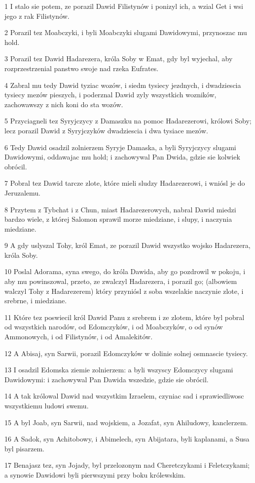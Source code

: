 \par 1 I stalo sie potem, ze porazil Dawid Filistynów i ponizyl ich, a wzial Get i wsi jego z rak Filistynów.
\par 2 Porazil tez Moabczyki, i byli Moabczyki slugami Dawidowymi, przynoszac mu hold.
\par 3 Porazil tez Dawid Hadarezera, króla Soby w Emat, gdy byl wyjechal, aby rozprzestrzenial panstwo swoje nad rzeka Eufrates.
\par 4 Zabral mu tedy Dawid tyziac wozów, i siedm tysiecy jezdnych, i dwadziescia tysiecy mezów pieszych, i poderznal Dawid zyly wszystkich wozników, zachowawszy z nich koni do sta wozów.
\par 5 Przyciagneli tez Syryjczycy z Damaszku na pomoc Hadarezerowi, królowi Soby; lecz porazil Dawid z Syryjczyków dwadziescia i dwa tysiace mezów.
\par 6 Tedy Dawid osadzil zolnierzem Syryje Damaska, a byli Syryjczycy slugami Dawidowymi, oddawajac mu hold; i zachowywal Pan Dwida, gdzie sie kolwiek obrócil.
\par 7 Pobral tez Dawid tarcze zlote, które mieli sludzy Hadarezerowi, i wniósl je do Jeruzalemu.
\par 8 Przytem z Tybchat i z Chun, miast Hadarezerowych, nabral Dawid miedzi bardzo wiele, z której Salomon sprawil morze miedziane, i slupy, i naczynia miedziane.
\par 9 A gdy uslyszal Tohy, król Emat, ze porazil Dawid wszystko wojsko Hadarezera, króla Soby.
\par 10 Poslal Adorama, syna swego, do króla Dawida, aby go pozdrowil w pokoju, i aby mu powinszowal, przeto, ze zwalczyl Hadarezera, i porazil go; (albowiem walczyl Tohy z Hadarezerem) który przyniósl z soba wszelakie naczynie zlote, i srebrne, i miedziane.
\par 11 Które tez poswiecil król Dawid Panu z srebrem i ze zlotem, które byl pobral od wszystkich narodów, od Edomczyków, i od Moabczyków, o od synów Ammonowych, i od Filistynów, i od Amalekitów.
\par 12 A Abisaj, syn Sarwii, porazil Edomczyków w dolinie solnej osmnascie tysiecy.
\par 13 I osadzil Edomska ziemie zolnierzem: a byli wszyscy Edomczycy slugami Dawidowymi: i zachowywal Pan Dawida wszedzie, gdzie sie obrócil.
\par 14 A tak królowal Dawid nad wszystkim Izraelem, czyniac sad i sprawiedliwosc wszystkiemu ludowi swemu.
\par 15 A byl Joab, syn Sarwii, nad wojskiem, a Jozafat, syn Ahiludowy, kanclerzem.
\par 16 A Sadok, syn Achitobowy, i Abimelech, syn Abijatara, byli kaplanami, a Susa byl pisarzem.
\par 17 Benajasz tez, syn Jojady, byl przelozonym nad Cheretczykami i Feletczykami; a synowie Dawidowi byli pierwszymi przy boku królewskim.


